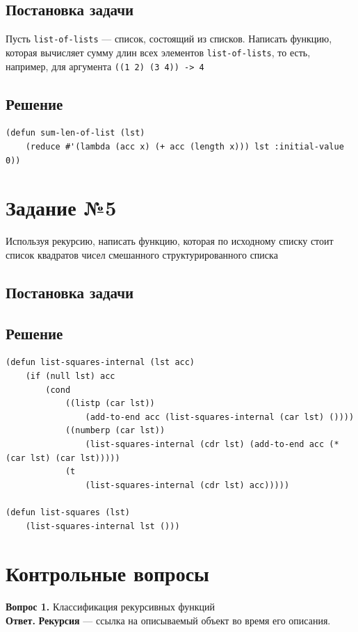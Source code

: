 \documentclass[12pt]{report}
\begin{document}
\subsection*{Постановка задачи}
Пусть \texttt{list-of-lists} --- список, состоящий из списков. Написать функцию, которая вычисляет сумму длин всех элементов \texttt{list-of-lists}, то есть, например, для аргумента \texttt{((1 2) (3 4)) -> 4}

\subsection*{Решение}
\begin{lstlisting}
(defun sum-len-of-list (lst)
	(reduce #'(lambda (acc x) (+ acc (length x))) lst :initial-value 0))
\end{lstlisting}

\section*{Задание №5}
Используя рекурсию, написать функцию, которая по исходному списку стоит список квадратов чисел смешанного структурированного списка

\subsection*{Постановка задачи}
\subsection*{Решение}
\begin{lstlisting}
(defun list-squares-internal (lst acc)
	(if (null lst) acc
		(cond 
			((listp (car lst))
				(add-to-end acc (list-squares-internal (car lst) ())))
			((numberp (car lst))
				(list-squares-internal (cdr lst) (add-to-end acc (* (car lst) (car lst)))))
			(t
				(list-squares-internal (cdr lst) acc)))))

(defun list-squares (lst)
	(list-squares-internal lst ()))
\end{lstlisting}

\section*{Контрольные вопросы}
\textbf{Вопрос 1.} Классификация рекурсивных функций\\

\textbf{Ответ.} \textbf{Рекурсия} --- ссылка на описываемый объект во время его описания.\\
\end{document}
